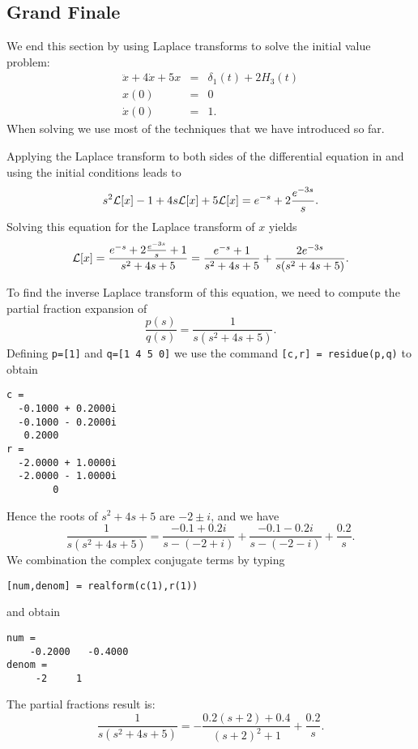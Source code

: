\documentclass{ximera}
\begin{document}
\subsection*{Grand Finale}

We end this section by using Laplace transforms to solve the initial 
value problem:
\begin{equation}  \label{eq:lapendexam}
\begin{array}{rcl}
\ddot x + 4\dot x +5x  & = & \delta_1(t)+2H_3(t) \\
x(0) & = & 0 \\
\dot x(0) & = & 1.
\end{array}
\end{equation}
When solving  we use most of the techniques that we have 
introduced so far.  

Applying the Laplace transform to both sides of the differential
equation in  and using the initial conditions leads to
\[
s^2{\cal L}[x] -1 + 4s{\cal L}[x] + 5{\cal L}[x]=
e^{-s} +2\frac{e^{-3s}}{s}.
\]
Solving this equation for the Laplace transform of $x$ yields
\[
{\cal L}[x] = \frac{e^{-s} +2\frac{e^{-3s}}{s}+1}{s^2+4s+5}
= \frac{e^{-s}+1}{s^2+4s+5}+ \frac{2e^{-3s}}{s(s^2+4s+5)}.
\]

To find the inverse Laplace transform
of this equation, we need to 
compute the partial fraction expansion of 
\[
\frac{p(s)}{q(s)} = \frac{1}{s(s^2+4s+5)}.
\]
Defining {\tt p=[1]} and {\tt q=[1 4 5 0]} we use the 
command {\tt [c,r] = residue(p,q)} to obtain 
\begin{verbatim}
c =
  -0.1000 + 0.2000i
  -0.1000 - 0.2000i
   0.2000          
r =
  -2.0000 + 1.0000i
  -2.0000 - 1.0000i
        0          
\end{verbatim}

Hence the roots of $s^2+4s+5$ are $-2\pm i$, and we have
\[
\frac{1}{s(s^2+4s+5)} = \frac{-0.1 + 0.2i}{s-(-2+i)}+
\frac{-0.1-0.2i}{s-(-2-i)}+\frac{0.2}{s}.
\]
We combination the complex conjugate terms by typing
\begin{verbatim}
[num,denom] = realform(c(1),r(1))
\end{verbatim}
and obtain
\begin{verbatim}
num =
    -0.2000   -0.4000
denom =
     -2     1
\end{verbatim}
The partial fractions result is:
\[
\frac{1}{s(s^2+4s+5)} = -\frac{0.2(s+2)+0.4}{(s+2)^2+1}
+\frac{0.2}{s}.
\]
\end{document}
